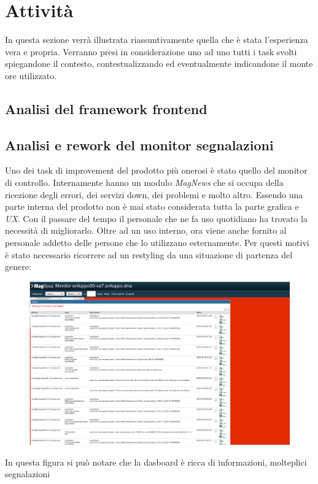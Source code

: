 \documentclass[a4paper]{article}
\begin{document}
\section{Attività}
\par In questa sezione verrà illustrata riassuntivamente quella che è stata l'esperienza vera e propria.
Verranno presi in considerazione uno ad uno tutti i task svolti spiegandone il contesto, contestualizzando
ed eventualmente indicandone il monte ore utilizzato.
\subsection{Analisi del framework frontend}
\subsection{Analisi e rework del monitor segnalazioni}
\par Uno dei task di improvement del prodotto più onerosi è stato quello del monitor di controllo.
Internamente hanno un modulo \emph{MagNews} che si occupa della ricezione degli errori,
dei servizi down, dei problemi e molto altro. Essendo una parte interna del prodotto
non è mai stato considerata tutta la parte grafica e \emph{UX}. Con il passare del tempo
il personale che ne fa uso quotidiano ha trovato la necessità di migliorarlo.
Oltre ad un uso interno, ora viene anche fornito al personale addetto delle persone che
lo utilizzano esternamente. Per questi motivi è stato necessario ricorrere ad un restyling
da una situazione di partenza del genere:
\begin{figure}[H]
	\includegraphics[width=\textwidth]{dashboard_old.png}
	\centering
\end{figure}
In questa figura si può notare che la dasboard è ricca di informazioni, molteplici segnalazioni
\end{document}
